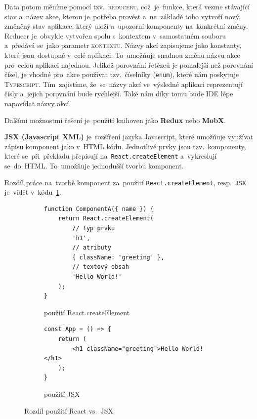 \documentclass[14pt,a4paper]{article}
\begin{document}
        Data potom měníme pomocí tzv.~\textsc{reduceru}, což~je~funkce, která vezme stávající stav a~název akce, kterou je~potřeba provést a~na~základě toho vytvoří nový, změněný stav aplikace, který uloží a~upozorní komponenty na~konkrétní změny. Reducer je~obvykle vytvořen spolu s~kontextem v~samostatném souboru a~předává se~jako parametr \textsc{kontextu}. Názvy akcí zapisujeme jako konstanty, které jsou~dostupné v~celé aplikaci. To~umožňuje snadnou změnu názvu akce pro~celou aplikaci najednou. Jelikož porovnání řetězců je pomalejší než porovnání čísel, je vhodné pro~akce používat tzv.~číselníky (\texttt{enum}), které nám poskytuje \textsc{Typescript}. Tím~zajistíme, že~se~názvy akcí ve~výsledné aplikaci reprezentují čísly a~jejich porovnání bude rychlejší. Také nám díky tomu bude \textsc{IDE} lépe napovídat názvy akcí.

        Dalšími možnostmi řešení je~použití knihoven jako \textbf{Redux} nebo \textbf{MobX}.
        
        \textbf{JSX (Javascript XML)} je~rozšíření jazyka Javascript, které umožňuje využívat zápisu komponent jako v~HTML kódu. Jednotlivé prvky jsou tzv.~komponenty, které se~při~překladu přepisují na~\texttt{React.createElement} a~vykreslují se~do~HTML. To~umožňuje jednodušší tvorbu komponent. \parencite{reactJSX}

        Rozdíl práce na~tvorbě komponent za~použití \texttt{React.createElement}, resp.~\texttt{JSX} je~vidět v~kódu~\ref{JSXcomponent}.
        \begin{figure}
            \begin{subfigure}[b]{0.45\linewidth}
                \begin{verbatim}
function ComponentA({ name }) {
    return React.createElement(
        // typ prvku
        'h1',
        // atributy
        { className: 'greeting' },
        // textový obsah
        'Hello World!'
    );
}
                \end{verbatim}
                \caption{použití React.createElement}
            \end{subfigure}
            \hfill
            \begin{subfigure}[b]{0.45\linewidth}
                \begin{verbatim}
const App = () => {
    return (
        <h1 className="greeting">Hello World!</h1>
    );
}
                \end{verbatim}
                \vspace{1cm}
                \caption{použití JSX}
            \end{subfigure}
            \label{JSXcomponent}
            \caption{Rozdíl použití React vs.~JSX}
        \end{figure}
\end{document}

